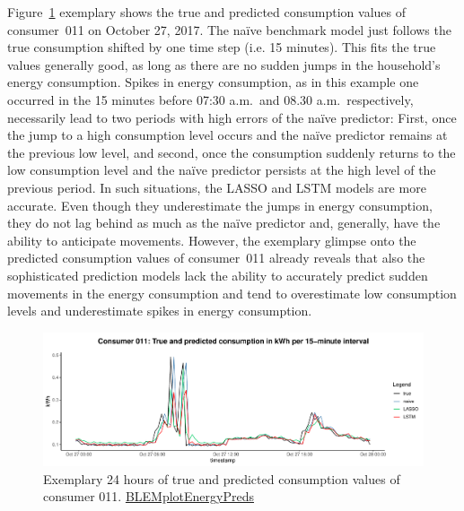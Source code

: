 Figure~\ref{Fig:glimpse_predcons} exemplary shows the true and predicted consumption values of consumer~011 on October 27, 2017. The na\"ive benchmark model just follows the true consumption shifted by one time step (i.e. 15 minutes). This fits the true values generally good, as long as there are no sudden jumps in the household's energy consumption. Spikes in energy consumption, as in this example one occurred in the 15 minutes before 07:30 a.m.~and 08.30 a.m.~respectively, necessarily lead to two periods with high errors of the na\"ive predictor: First, once the jump to a high consumption level occurs and the na\"ive predictor remains at the previous low level, and second, once the consumption suddenly returns to the low consumption level and the na\"ive predictor persists at the high level of the previous period. In such situations, the LASSO and LSTM models are more accurate. Even though they underestimate the jumps in energy consumption, they do not lag behind as much as the na\"ive predictor and, generally, have the ability to anticipate movements. However, the exemplary glimpse onto the predicted consumption values of consumer~011 already reveals that also the sophisticated prediction models lack the ability to accurately predict sudden movements in the energy consumption and tend to overestimate low consumption levels and underestimate spikes in energy consumption.
%
\begin{figure}[htbp]
    \centering
    \includegraphics[width=\textwidth]{thesis/graphs/evaluation/c011_pred_cons.pdf}
    \caption[Exemplary 24 hours of true and predicted consumption values]{Exemplary 24 hours of true and predicted consumption values of consumer 011. \quantnet\href{https://github.com/QuantLet/BLEM/tree/master/BLEMplotEnergyPreds}{BLEMplotEnergyPreds}}
    \label{Fig:glimpse_predcons}
\end{figure}
%

